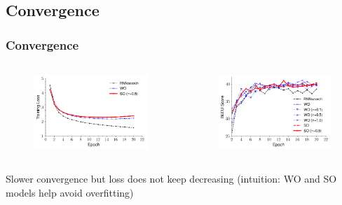 \documentclass{beamer}
\begin{document}

\subsection{Convergence}

\begin{frame}
    \frametitle{Convergence}
    \begin{columns}[T]
        \begin{column}{0.48\textwidth}
            \begin{figure}
                \centering
                \includegraphics[width=\textwidth]{fig/training_curve_loss.png}
            \end{figure}
        \end{column}
        \begin{column}{0.48\textwidth}
            \begin{figure}
                \centering
                \includegraphics[width=\textwidth]{fig/dev_curve_bleu.png}
            \end{figure}
        \end{column}
    \end{columns}
    Slower convergence but loss does not keep decreasing (intuition: WO and SO models help avoid overfitting)
\end{frame}
\end{document}

